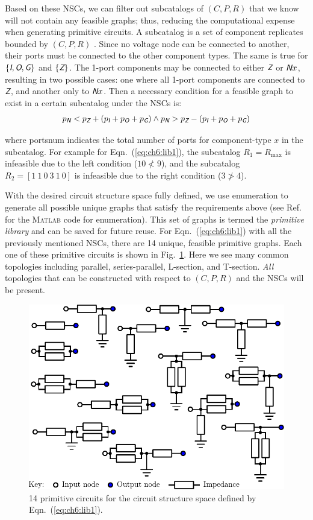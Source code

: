Based on these NSCs, we can filter out subcatalogs of $(C,P,R)$ that we know will not contain any feasible graphs; thus, reducing the computational expense when generating primitive circuits.
A subcatalog is a set of component replicates bounded by $(C,P,R)$ \cite{Herber2017d}.
Since no voltage node can be connected to another, their ports must be connected to the other component types. The same is true for $\{ \textsl{\textsf{I}}, \textsl{\textsf{O}}, \textsl{\textsf{G}} \}$ and $\{ \textsl{\textsf{Z}} \}$.
The 1-port components may be connected to either $\textsl{\textsf{Z}}$ or $\textsl{\textsf{N}}x$, resulting in two possible cases: one where all 1-port components are connected to $\textsl{\textsf{Z}}$, and another only to $\textsl{\textsf{N}}x$.
Then a necessary condition for a feasible graph to exist in a certain subcatalog under the NSCs is:
\begin{align} \label{eq:ch6:subcatalog:feas}
p_{\textsl{\textsf{N}}} < p_{\textsl{\textsf{Z}}} + \left( p_{\textsl{\textsf{I}}} + p_{\textsl{\textsf{O}}} + p_{\textsl{\textsf{G}}} \right) \land p_{\textsl{\textsf{N}}} > p_{\textsl{\textsf{Z}}} - \left(p_{\textsl{\textsf{I}}} + p_{\textsl{\textsf{O}}} + p_{\textsl{\textsf{G}}} \right)
\end{align}

\noindent where \gls{portsnum} indicates the total number of ports for component-type $x$ in the subcatalog.
For example for Eqn.~(\ref{eq:ch6:lib1}), the subcatalog $R_1=R_{\max}$ is infeasible due to the left condition ($10 \nless 9$), and the subcatalog $R_2=\left[ 1\ 1\ 0\ 3\ 1\ 0 \right]$ is infeasible due to the right condition ($3 \ngtr 4$).

With the desired circuit structure space fully defined, we use enumeration to generate all possible unique graphs that satisfy the requirements above (see Ref.~\cite{github-pm-architectures-project} for the \textsc{Matlab} code for enumeration).
This set of graphs is termed the \textit{primitive library} and can be saved for future reuse.
For Eqn.~(\ref{eq:ch6:lib1}) with all the previously mentioned NSCs, there are 14 unique, feasible primitive graphs.
Each one of these primitive circuits is shown in Fig.~\ref{fig:ch6:primitive:lib}. Here we see many common topologies including parallel, series-parallel, L-section, and T-section.
\textit{All} topologies that can be constructed with respect to $(C,P,R)$ and the NSCs will be present.

\begin{figure}
\centering
\includegraphics[width=0.55\columnwidth]{../ch6/figures/primitive_lib.pdf}
\caption{14 primitive circuits for the circuit structure space defined by Eqn.~(\ref{eq:ch6:lib1}).\label{fig:ch6:primitive:lib}}
\end{figure}

